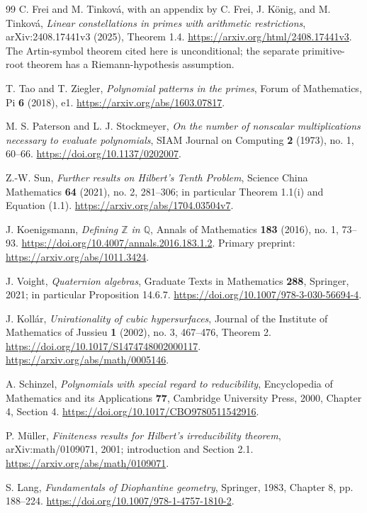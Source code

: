 \documentclass[11pt]{article}
\theoremstyle{definition}
\newcommand{\Q}{\mathbb Q}
\newcommand{\Z}{\mathbb Z}
\begin{document}
\begin{thebibliography}{99}
C. Frei and M. Tinkov\'a, with an appendix by C. Frei, J. K\"onig,
and M. Tinkov\'a, \emph{Linear constellations in primes with arithmetic
restrictions}, arXiv:2408.17441v3 (2025), Theorem 1.4.
\url{https://arxiv.org/html/2408.17441v3}.
The Artin-symbol theorem cited here is unconditional; the separate
primitive-root theorem has a Riemann-hypothesis assumption.

T. Tao and T. Ziegler, \emph{Polynomial patterns in the primes},
Forum of Mathematics, Pi \textbf{6} (2018), e1.
\url{https://arxiv.org/abs/1603.07817}.

M. S. Paterson and L. J. Stockmeyer, \emph{On the number of nonscalar
multiplications necessary to evaluate polynomials}, SIAM Journal on
Computing \textbf{2} (1973), no. 1, 60--66.
\url{https://doi.org/10.1137/0202007}.

Z.-W. Sun, \emph{Further results on Hilbert's Tenth Problem},
Science China Mathematics \textbf{64} (2021), no. 2, 281--306;
in particular Theorem 1.1(i) and Equation (1.1).
\url{https://arxiv.org/abs/1704.03504v7}.

J. Koenigsmann, \emph{Defining $\Z$ in $\Q$}, Annals of Mathematics
\textbf{183} (2016), no. 1, 73--93.
\url{https://doi.org/10.4007/annals.2016.183.1.2}.
Primary preprint: \url{https://arxiv.org/abs/1011.3424}.

J. Voight, \emph{Quaternion algebras}, Graduate Texts in Mathematics
\textbf{288}, Springer, 2021; in particular Proposition 14.6.7.
\url{https://doi.org/10.1007/978-3-030-56694-4}.

J. Koll\'ar, \emph{Unirationality of cubic hypersurfaces}, Journal
of the Institute of Mathematics of Jussieu \textbf{1} (2002), no. 3,
467--476, Theorem 2.
\url{https://doi.org/10.1017/S1474748002000117}.
\url{https://arxiv.org/abs/math/0005146}.

A. Schinzel, \emph{Polynomials with special regard to reducibility},
Encyclopedia of Mathematics and its Applications \textbf{77},
Cambridge University Press, 2000, Chapter 4, Section 4.
\url{https://doi.org/10.1017/CBO9780511542916}.

P. M\"uller, \emph{Finiteness results for Hilbert's irreducibility
theorem}, arXiv:math/0109071, 2001; introduction and Section 2.1.
\url{https://arxiv.org/abs/math/0109071}.

S. Lang, \emph{Fundamentals of Diophantine geometry}, Springer, 1983,
Chapter 8, pp. 188--224.
\url{https://doi.org/10.1007/978-1-4757-1810-2}.


\end{thebibliography}
\end{document}
